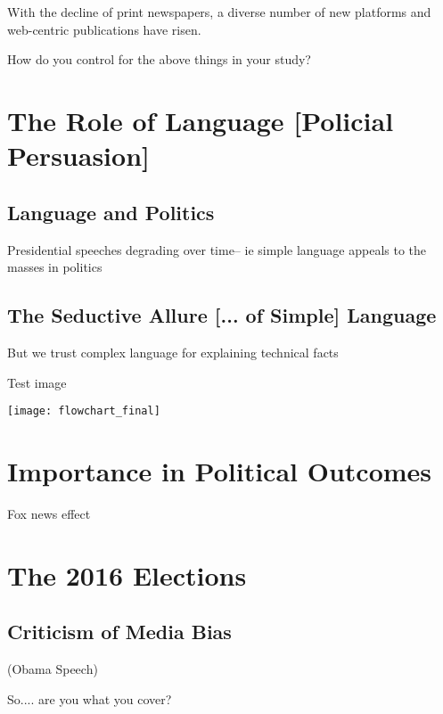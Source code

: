 With the decline of print newspapers, a diverse number of new platforms and web-centric publications have risen.


How do you control for the above things in your study?

\section{The Role of Language [Policial Persuasion]}




\subsection{Language and Politics}
Presidential speeches degrading over time-- ie simple language appeals to the masses in politics
\subsection{The Seductive Allure [... of Simple] Language}
But we trust complex language for explaining technical facts

Test image

\texttt{[image: flowchart\_final]}


\section{Importance in Political Outcomes}
Fox news effect 

\section{The 2016 Elections} 
\subsection{Criticism of Media Bias} 
(Obama Speech)

So.... are you what you cover?








